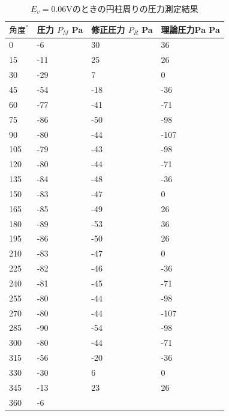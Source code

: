 \documentclass[twocolumn,10pt,a4j]{jsarticle}
\begin{document}
      \begin{table}[]
        \centering
          \caption{$E_{v}=0.06$Vのときの円柱周りの圧力測定結果}
          \label{my-label}
          \footnotesize
          \begin{tabular}{llll}
            $角度^\circ$ & 圧力 $P_{M}$ Pa & 修正圧力 $P_{R}$ Pa & 理論圧力Pa Pa\\ \hline
            0&	-6& 	30& 	36  \\
            15&	-11& 	25& 	26  \\
            30&	-29&	7& 	0  \\
            45&	-54& 	-18& 	-36 \\ 
            60&	-77& 	-41& 	-71  \\
            75&	-86& 	-50& 	-98  \\
            90&	-80& 	-44& 	-107  \\
            105&	-79& 	-43& 	-98  \\
            120&	-80& 	-44& 	-71  \\
            135&	-84& 	-48& 	-36  \\
            150&	-83& 	-47& 	0  \\
            165&	-85& 	-49& 	26  \\
            180&	-89& 	-53& 	36  \\
            195&	-86& 	-50& 	26  \\
            210&	-83& 	-47& 	0  \\
            225&	-82& 	-46& 	-36  \\
            240&	-81& 	-45& 	-71  \\
            255&	-80& 	-44& 	-98  \\
            270&	-80& 	-44& 	-107  \\
            285&	-90& 	-54& 	-98  \\
            300&	-80& 	-44& 	-71  \\
            315&	-56& 	-20& 	-36  \\
            330&	-30& 	6& 	0  \\
            345&	-13& 	23& 	26  \\
            360&	-6& 		 \\
          \end{tabular}
      \end{table}
\end{document}
